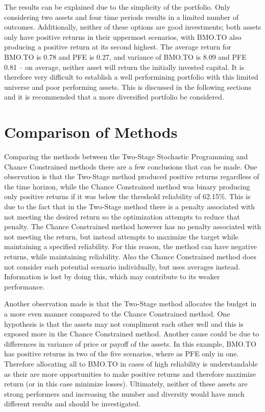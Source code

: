 \documentclass[12pt]{article}
\begin{document}
The results can be explained due to the simplicity of the portfolio.
Only considering two assets and four time periods results in a limited number of outcomes.
Additionally, neither of these options are good investments; both assets only have positive returns in their uppermost scenarios, with BMO.TO also producing a positive return at its second highest.
The average return for BMO.TO is 0.78 and PFE is 0.27, and variance of BMO.TO is 8.09 and PFE 0.81 -- on average, neither asset will return the initially invested capital.
It is therefore very difficult to establish a well performining portfolio with this limited universe and poor performing assets.
This is discussed in the following sections and it is recommended that a more diversified portfolio be considered.


\section{Comparison of Methods}
Comparing the methods between the Two-Stage Stochastic Programming and Chance Constrained methods there are a few conclusions that can be made. One observation is that the Two-Stage method produced positive returns regardless of the time horizon, while the Chance Constrained method was binary producing only positive returns if it was below the threshold reliability of 62.15\%. This is due to the fact that in the Two-Stage method there is a penalty associated with not meeting the desired return so the optimization attempts to reduce that penalty. The Chance Constrained method however has no penalty associated with not meeting the return, but instead attempts to maximize the target while maintaining a specified reliability. For this reason, the method can have negative returns, while maintaining reliability. Also the Chance Constrained method does not consider each potential scenario individually, but uses averages instead. Information is lost by doing this, which may contribute to its weaker performance.

Another observation made is that the Two-Stage method allocates the budget in a more even manner compared to the Chance Constrained method. 
One hypothesis is that the assets may not compliment each other well and this is exposed more in the Chance Constrained method. 
Another cause could be due to differences in variance of price or payoff of the assets. In this example, BMO.TO has positive returns in two of the five scenarios, where as PFE only in one. Therefore allocating all to BMO.TO in cases of high reliability is understandable as their are more opportunities to make positive returns and therefore maximize return (or in this case minimize losses).
Ultimately, neither of these assets are strong performers and increasing the number and diversity would have much different results and should be investigated.
\end{document}

